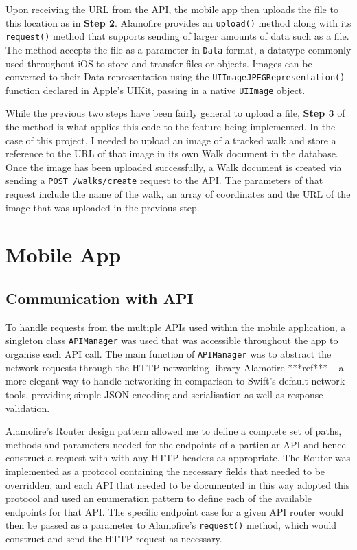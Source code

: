 
Upon receiving the URL from the API, the mobile app then uploads the file to this location as in \textbf{Step 2}. Alamofire provides an \texttt{upload()} method along with its \texttt{request()} method that supports sending of larger amounts of data such as a file. The method accepts the file as a parameter in \texttt{Data} format, a datatype commonly used throughout iOS to store and transfer files or objects. Images can be converted to their Data representation using the \texttt{UIImageJPEGRepresentation()} function declared in Apple's UIKit, passing in a native \texttt{UIImage} object.

While the previous two steps have been fairly general to upload a file, \textbf{Step 3} of the method is what applies this code to the feature being implemented. In the case of this project, I needed to upload an image of a tracked walk and store a reference to the URL of that image in its own Walk document in the database. Once the image has been uploaded successfully, a Walk document is created via sending a \texttt{POST /walks/create} request to the API. The parameters of that request include the name of the walk, an array of coordinates and the URL of the image that was uploaded in the previous step.

\section{Mobile App}

\subsection{Communication with API}


To handle requests from the multiple APIs used within the mobile application, a singleton class \texttt{APIManager} was used that was accessible throughout the app to organise each API call. The main function of \texttt{APIManager} was to abstract the network requests through the HTTP networking library Alamofire ***ref*** -- a more elegant way to handle networking in comparison to Swift's default network tools, providing simple JSON encoding and serialisation as well as response validation.

Alamofire's Router design pattern allowed me to define a complete set of paths, methods and parameters needed for the endpoints of a particular API and hence construct a request with with any HTTP headers as appropriate. The Router was implemented as a protocol containing the necessary fields that needed to be overridden, and each API that needed to be documented in this way adopted this protocol and used an enumeration pattern to define each of the available endpoints for that API. The specific endpoint case for a given API router would then be passed as a parameter to Alamofire's \texttt{request()} method, which would construct and send the HTTP request as necessary.

